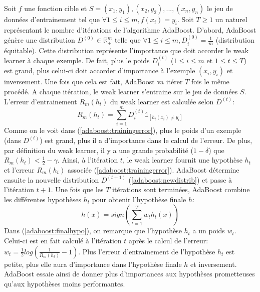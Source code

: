 \documentclass[12pt]{article}
\begin{document}
	Soit $f$ une fonction cible et $S=(x_1,y_1),(x_2,y_2),...,(x_n,y_n)$ le jeu de données d'entrainement tel que $\forall 1 \leq i \leq m, f(x_i) = y_i$. Soit $T \geq 1$ un naturel représentant le nombre d'itérations de l'algorithme AdaBoost. D'abord, AdaBoost génère une distribution $D^{(0)} \in \mathbb{R}^m_+$ telle que $\forall 1 \leq i \leq m, D^{(0)}_i = \frac{1}{m}$ (distribution équitable). Cette distribution représente l'importance que doit accorder le weak learner à chaque exemple. De fait, plus le poids $D^{(t)}_i$ ($1 \leq i \leq m$ et $1 \leq t \leq T$) est grand, plus celui-ci doit accorder d'importance à l'exemple $(x_i,y_i)$ et inversement. Une fois que cela est fait, AdaBoost va itérer $T$ fois le même procédé. A chaque itération, le weak learner s'entraine sur le jeu de données $S$. L'erreur d'entrainement $R_m(h_t)$ du weak learner est calculée selon $D^{(t)}$:
	\begin{equation}
		\label{adaboost:trainingerror}
		R_m(h_t) = \sum_{i=1}^m D^{(t)}_i \mathbb{1}_{[h_t(x_i) \neq y_i]}
	\end{equation}
	Comme on le voit dans (\ref{adaboost:trainingerror}), plus le poids d'un exemple (dans $D^{(t)}$) est grand, plus il a d'importance dans le calcul de l'erreur. De plus, par définition du weak learner, il y a une grande probabilité ($1- \delta$) que $R_m(h_t)< \frac{1}{2} - \gamma$. Ainsi, à l'itération $t$, le weak learner fournit une hypothèse $h_t$ et l'erreur $R_m(h_t)$ associée (\ref{adaboost:trainingerror}). AdaBoost détermine ensuite la nouvelle distribution $D^{(t+1)}$ (\ref{adaboost:newdistrib}) et passe à l'itération $t+1$. Une fois que les $T$ itérations sont terminées, AdaBoost combine les différentes hypothèses $h_t$ pour obtenir l'hypothèse finale $h$:
	\begin{equation}
		\label{adaboost:finalhypo}
		h(x) = sign (\sum_{t=1}^T w_t h_t(x))
	\end{equation}
	Dans (\ref{adaboost:finalhypo}), on remarque que l'hypothèse $h_t$ a un poids $w_t$. Celui-ci est en fait calculé à l'itération $t$ après le calcul de l'erreur: $w_t = \frac{1}{2} log(\frac{1}{R_m(h_t)} - 1)$. Plus l'erreur d'entrainement de l'hypothèse $h_t$ est petite, plus elle aura d'importance dans l'hypothèse finale $h$ et inversement. AdaBoost essaie ainsi de donner plus d'importances aux hypothèses prometteuses qu'aux hypothèses moins performantes.
	
	
\end{document}
